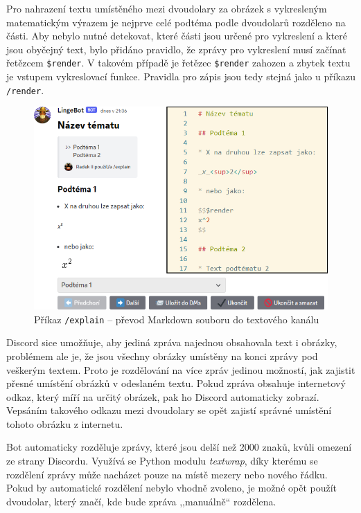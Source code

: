 \documentclass[FM]{tulthesis}
\begin{document}
	Pro nahrazení textu umístěného mezi dvoudolary za obrázek s vykresleným matematickým výrazem je nejprve celé podtéma podle dvoudolarů rozděleno na části. Aby nebylo nutné detekovat, které části jsou určené pro vykreslení a které jsou obyčejný text, bylo přidáno pravidlo, že zprávy pro vykreslení musí začínat řetězcem \verb|$render|. V takovém případě je řetězec \verb|$render| zahozen a zbytek textu je vstupem vykreslovací funkce. Pravidla pro zápis jsou tedy stejná jako u příkazu \verb|/render|.
	
	\begin{figure}[ht]
		\centering
		\includegraphics[width=\textwidth]{img/5X/Explain1}
		\caption{Příkaz \texttt{/explain} – převod Markdown souboru do textového kanálu}
	\end{figure}
	
	Discord sice umožňuje, aby jediná zpráva najednou obsahovala text i obrázky, problémem ale je, že jsou všechny obrázky umístěny na konci zprávy pod veškerým textem. Proto je rozdělování na více zpráv jedinou možností, jak zajistit přesné umístění obrázků v odeslaném textu. Pokud zpráva obsahuje internetový odkaz, který míří na určitý obrázek, pak ho Discord automaticky zobrazí. Vepsáním takového odkazu mezi dvoudolary se opět zajistí správné umístění tohoto obrázku z internetu.
	
	Bot automaticky rozděluje zprávy, které jsou delší než 2000 znaků, kvůli omezení ze strany Discordu. Využívá se Python modulu \textit{textwrap}, díky kterému se rozdělení zprávy může nacházet pouze na místě mezery nebo nového řádku. Pokud by automatické rozdělení nebylo vhodně zvoleno, je možné opět použít dvoudolar, který značí, kde bude zpráva ,,manuálně`` rozdělena.
	
\end{document}
